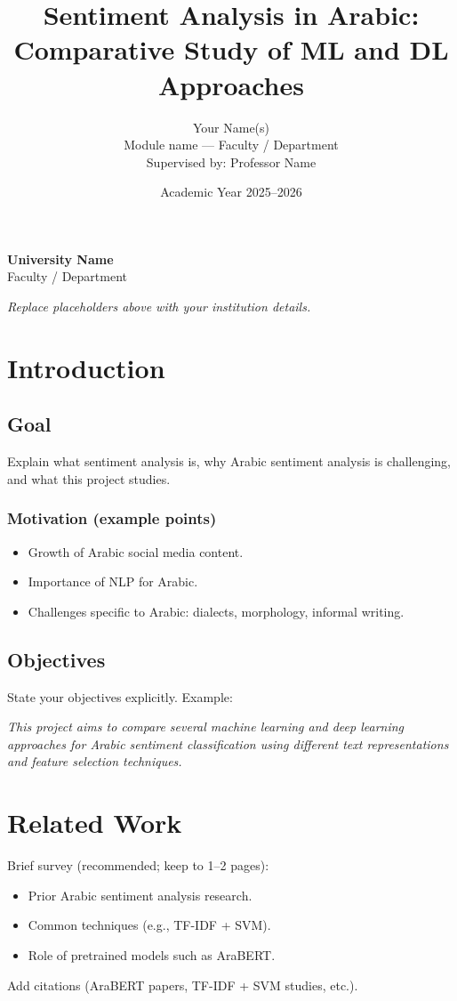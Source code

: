 \documentclass[11pt,a4paper]{report}
\title{Sentiment Analysis in Arabic:\\Comparative Study of ML and DL Approaches}
\author{Your Name(s)\\\small Module name --- Faculty / Department\\\small Supervised by: Professor Name}
\date{Academic Year 2025--2026}
\begin{document}
\maketitle

\begin{center}
\textbf{University Name}\\[0.5em]
Faculty / Department\\
\end{center}

\thispagestyle{empty}
\vfill
\begin{center}
\textit{Replace placeholders above with your institution details.}
\end{center}
\newpage

\tableofcontents
\clearpage

\chapter{Introduction}

\section{Goal}
Explain what sentiment analysis is, why Arabic sentiment analysis is challenging, and what this project studies.

\subsection*{Motivation (example points)}
\begin{itemize}[noitemsep]
    \item Growth of Arabic social media content.
    \item Importance of NLP for Arabic.
    \item Challenges specific to Arabic: dialects, morphology, informal writing.
\end{itemize}

\section{Objectives}
State your objectives explicitly. Example:

\textit{This project aims to compare several machine learning and deep learning approaches for Arabic sentiment classification using different text representations and feature selection techniques.}

\chapter{Related Work}
Brief survey (recommended; keep to 1--2 pages):
\begin{itemize}[noitemsep]
    \item Prior Arabic sentiment analysis research.
    \item Common techniques (e.g., TF-IDF + SVM).
    \item Role of pretrained models such as AraBERT.
\end{itemize}
Add citations (AraBERT papers, TF-IDF + SVM studies, etc.).
\end{document}
